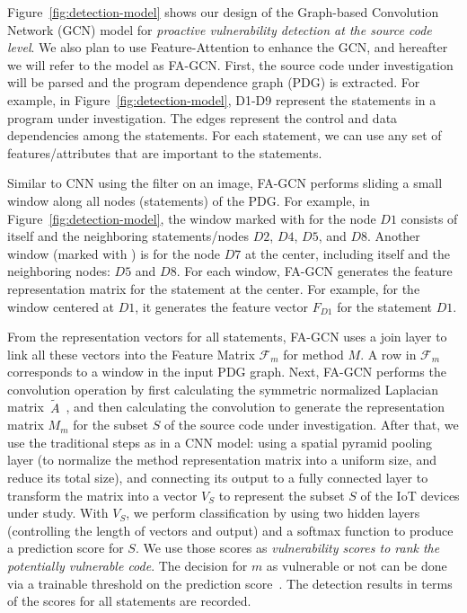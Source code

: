 Figure~\ref{fig:detection-model} shows our design of the Graph-based
Convolution Network (GCN) model for {\em proactive vulnerability
  detection at the source code level}. We also plan to use
Feature-Attention to enhance the GCN, and hereafter we will refer to
the model as FA-GCN. First, the source code under investigation will
be parsed and the program dependence graph (PDG) is extracted.  For
example, in Figure~\ref{fig:detection-model}, D1-D9 represent the
statements in a program under investigation. The edges represent the
control and data dependencies among the statements. For each
statement, we can use any set of features/attributes that are
important to the statements.


Similar to CNN using the filter on an image, FA-GCN performs sliding a
small window along all nodes (statements) of the PDG. For example, in
Figure~\ref{fig:detection-model}, the window marked with 
for the node $D1$ consists of itself and the neighboring
statements/nodes $D2$, $D4$, $D5$, and $D8$. Another window (marked
with ) is for the node $D7$ at the center, including itself
and the neighboring nodes: $D5$ and $D8$. For each window, FA-GCN
generates the feature representation matrix for the statement at the
center. For example, for the window centered at $D1$, it generates the
feature vector $F_{D1}$ for the statement $D1$. 

From the representation vectors for all statements, FA-GCN uses a join
layer to link all these vectors into the Feature Matrix
$\mathcal{F}_{m}$ for method $M$. A row in $\mathcal{F}_m$ corresponds
to a window in the input PDG graph.  Next, FA-GCN performs the
convolution operation by first calculating the symmetric normalized
Laplacian matrix~$\tilde{A}$~\cite{GCN16}, and then calculating the
convolution to generate the representation matrix $M_{m}$ for the
subset $S$ of the source code under investigation. After that, we use
the traditional steps as in a CNN model: using a spatial pyramid
pooling layer (to normalize the method representation matrix into a
uniform size, and reduce its total size), and connecting its output to
a fully connected layer to transform the matrix into a vector $V_S$ to
represent the subset $S$ of the IoT devices under study. With $V_S$,
we perform classification by using two hidden layers (controlling the
length of vectors and output) and a softmax function to produce a
prediction score for $S$. We use those scores as {\em vulnerability
  scores to rank the potentially vulnerable code}. The decision for
$m$ as vulnerable or not can be done via a trainable threshold on the
prediction score~\cite{li2018vuldeepecker,li2019improving}. The
detection results in terms of the scores for all statements are
recorded.

